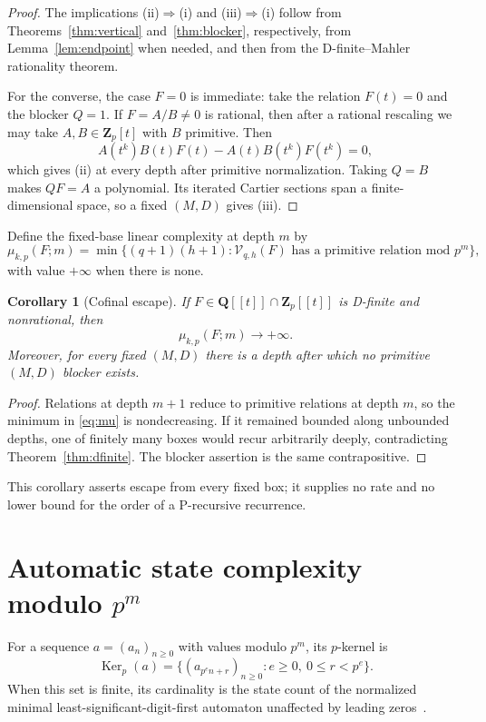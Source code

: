 \documentclass[11pt,reqno]{amsart}
\newtheorem{corollary}[theorem]{Corollary}
\theoremstyle{definition}
\theoremstyle{remark}
\DeclareMathOperator{\Ker}{Ker}
\newcommand{\Q}{\mathbf Q}
\newcommand{\Zp}{\mathbf Z_p}
\begin{document}
\begin{proof}
The implications (ii)$\Rightarrow$(i) and (iii)$\Rightarrow$(i) follow from
Theorems~\ref{thm:vertical} and~\ref{thm:blocker}, respectively, from
Lemma~\ref{lem:endpoint} when needed, and then from the
D-finite--Mahler rationality theorem.

For the converse, the case $F=0$ is immediate: take the relation $F(t)=0$
and the blocker $Q=1$.  If $F=A/B\ne0$ is rational, then
after a rational rescaling we may take $A,B\in\Zp[t]$ with $B$ primitive.
Then
\[
 A(t^k)B(t)F(t)-A(t)B(t^k)F(t^k)=0,
\]
which gives (ii) at every depth after primitive normalization.  Taking
$Q=B$ makes $QF=A$ a polynomial.  Its iterated Cartier sections span a
finite-dimensional space, so a fixed $(M,D)$ gives (iii).
\end{proof}

Define the fixed-base linear complexity at depth $m$ by
\begin{equation}\label{eq:mu}
 \mu_{k,p}(F;m)=
 \min\{(q+1)(h+1):\mathcal V_{q,h}(F)
 \text{ has a primitive relation mod }p^m\},
\end{equation}
with value $+\infty$ when there is none.

\begin{corollary}[Cofinal escape]\label{cor:escape}
If $F\in\Q[[t]]\cap\Zp[[t]]$ is D-finite and nonrational, then
\[
 \mu_{k,p}(F;m)\longrightarrow+\infty.
\]
Moreover, for every fixed $(M,D)$ there is a depth after which no primitive
$(M,D)$ blocker exists.
\end{corollary}

\begin{proof}
Relations at depth $m+1$ reduce to primitive relations at depth $m$, so the
minimum in \eqref{eq:mu} is nondecreasing.  If it remained bounded along
unbounded depths, one of finitely many boxes would recur arbitrarily deeply,
contradicting Theorem~\ref{thm:dfinite}.  The blocker assertion is the same
contrapositive.
\end{proof}

This corollary asserts escape from every fixed box; it supplies no rate and
no lower bound for the order of a P-recursive recurrence.

\section{Automatic state complexity modulo \texorpdfstring{$p^m$}{prime powers}}

For a sequence $a=(a_n)_{n\geq0}$ with values modulo $p^m$, its $p$-kernel
is
\[
 \Ker_p(a)=\{(a_{p^en+r})_{n\geq0}:e\geq0,\ 0\leq r<p^e\}.
\]
When this set is finite, its cardinality is the state count of the normalized
minimal least-significant-digit-first automaton unaffected by leading
zeros~\cite{eilenberg,rowlandyassawi}.
\end{document}
